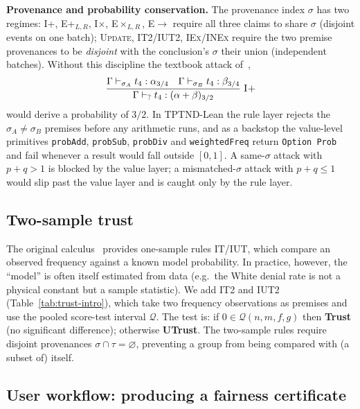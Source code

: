\documentclass{ceurart}
\newcommand{\smark}[1]{\textsc{#1}}
\newcommand{\Trust}{\textbf{Trust}}
\newcommand{\UTrust}{\textbf{UTrust}}
\newcommand{\CItwo}{\mathcal{Q}}
\begin{document}
\smallskip\noindent
\textbf{Provenance and probability conservation.}
The provenance index $\sigma$ has two regimes:
\textsc{I+}, \textsc{E+$_{L,R}$}, \textsc{I$\times$},
\textsc{E$\times_{L,R}$}, \textsc{E$\to$} require all three claims
to share $\sigma$ (disjoint events on one batch); \textsc{Update},
\textsc{IT2}/\textsc{IUT2}, \textsc{IEx}/\textsc{INEx} require the
two premise provenances to be \emph{disjoint} with the
conclusion's $\sigma$ their union (independent batches).
Without this discipline the textbook attack
of~\cite{dasaro2025tptnd},
\[
\dfrac{\Gamma \vdash_{\sigma_A} t_4:\alpha_{3/4} \quad
       \Gamma \vdash_{\sigma_B} t_4:\beta_{3/4}}
      {\Gamma \vdash_? t_4:(\alpha+\beta)_{3/2}}\;\smark{I+}
\]
would derive a probability of $3/2$.  In TPTND-Lean the rule layer
rejects the $\sigma_A \neq \sigma_B$ premises before any
arithmetic runs, and as a backstop the value-level primitives
\texttt{probAdd}, \texttt{probSub}, \texttt{probDiv} and
\texttt{weightedFreq} return \texttt{Option Prob} and fail
whenever a result would fall outside $[0,1]$.  A
same-$\sigma$ attack with $p+q>1$ is blocked by the value layer;
a mismatched-$\sigma$ attack with $p+q\le 1$ would slip past
the value layer and is caught only by the rule layer.

\subsection{Two-sample trust}\label{sec:it2}

The original calculus~\cite{dasaro2025tptnd} provides one-sample
rules \textsc{IT}/\textsc{IUT}, which compare an observed frequency
against a known model probability.
In practice, however, the ``model'' is often itself estimated from
data (e.g.\ the White denial rate is not a physical constant but a
sample statistic).
We add \textsc{IT2} and \textsc{IUT2}
(Table~\ref{tab:trust-intro}), which take two frequency
observations as premises and use the pooled score-test interval
$\CItwo$.
The test is: if $0\in\CItwo(n,m,f,g)$ then
\Trust{} (no significant difference); otherwise \UTrust{}.
The two-sample rules require disjoint provenances
$\sigma\cap\tau=\varnothing$, preventing a group from being
compared with (a subset of) itself.

\subsection{User workflow: producing a fairness
  certificate}\label{sec:workflow}
\end{document}
